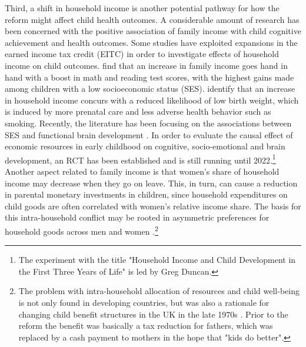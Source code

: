 \documentclass[11pt, a4paper]{article} %
\begin{document}
Third, a shift in household income is another potential pathway for how the reform might affect child health outcomes. A considerable amount of research has been concerned with the positive association of family income with child cognitive achievement and health outcomes. Some studies have exploited expansions in the earned income tax credit (EITC) in order to investigate effects of household income on child outcomes. \cite{dahl2012impact} find that an increase in family income goes hand in hand with a boost in math and reading test scores, with the highest gains made among children with a low socioeconomic status (SES). \cite{hoynes2015income} identify that an increase in household income concurs with a reduced likelihood of low birth weight, which is induced by more prenatal care and less adverse health behavior such as smoking. Recently, the literature has been focusing on the associations between SES and functional brain development \citep{tomalski2013}. In order to evaluate the causal effect of economic resources in early childhood on cognitive, socio-emotional and brain development, an RCT has been established and is still running until 2022.\footnote{The experiment with the title "Household Income and Child Development in the First Three Years of Life" is led by Greg Duncan.} \newline
Another aspect related to family income is that women's share of household income may decrease when they go on leave. This, in turn, can cause a reduction in parental monetary investments in children, since household expenditures on child goods are often correlated with women's relative income share. The basis for this intra-household conflict may be rooted in asymmetric preferences for household goods across men and women \citep{anderson2002economics}.\footnote{The problem with intra-household allocation of resources and child well-being is not only found in developing countries, but was also a rationale for changing child benefit structures in the UK in the late 1970s \citep{lundberg1996bargaining}. Prior to the reform the benefit was basically a tax reduction for fathers, which was replaced by a cash payment to mothers in the hope that "kids do better".}\newline
\end{document}
